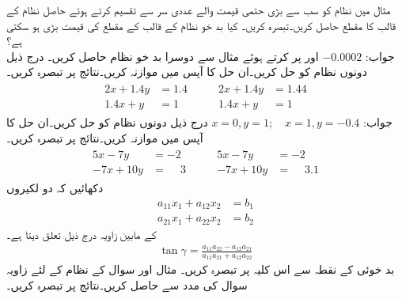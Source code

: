 
\quad
مثال  میں نظام کو سب سے بڑی حتمی قیمت والے عددی سر سے تقسیم کرتے ہوئے حاصل نظام کے قالب کا مقطع حاصل کریں۔تبصرہ کریں۔ کیا بد خو نظام کے قالب کے مقطع کی قیمت بڑی ہو سکتی ہے؟\\
جواب:\quad
$-0.0002$
\quad
{} اور  پر کرتے ہوئے مثال  سے دوسرا بد خو نظام حاصل کریں۔ 
\quad
درج ذیل دونوں نظام کو حل کریں۔ان حل کا آپس میں موازنہ کریں۔نتائج پر تبصرہ کریں۔
\begin{gather*}
\begin{aligned}
2x+1.4y&=1.4\\
1.4x+y&=1
\end{aligned}\quad\quad
\begin{aligned}
2x+1.4y&=1.44\\
1.4x+y&=1
\end{aligned}
\end{gather*}
جواب:\quad
$x=0,y=1;\quad x=1,y=-0.4$
\quad
درج ذیل دونوں نظام کو حل کریں۔ان حل کا آپس میں موازنہ کریں۔نتائج پر تبصرہ کریں۔
\begin{gather*}
\begin{aligned}
5x-7y&=-2\\
-7x+10y&=\phantom{-}3
\end{aligned}\quad\quad
\begin{aligned}
5x-7y&=-2\\
-7x+10y&=\phantom{-}3.1
\end{aligned}
\end{gather*}
\quad
دکھائیں کہ دو لکیروں
\begin{align*}
a_{11}x_1+a_{12}x_2&=b_1\\
a_{21}x_1+a_{22}x_2&=b_2
\end{align*}
کے مابین زاویہ  درج ذیل تعلق دیتا ہے۔
\begin{align*}
\tan \gamma=\frac{a_{11}a_{22}-a_{12}a_{21}}{a_{11}a_{21}+a_{12}a_{22}}
\end{align*}
بد خوئی کے نقطہ سے اس کلیہ پر تبصرہ کریں۔
\quad
مثال  اور سوال  کے نظام کے لئے زاویہ  سوال  کی مدد سے حاصل کریں۔نتائج پر تبصرہ کریں۔
